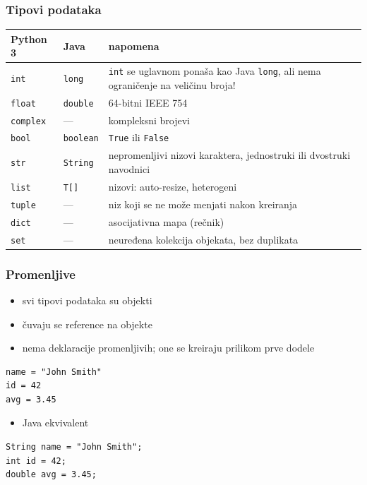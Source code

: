 \documentclass[compress]{beamer}
\begin{document}
\begin{frame}[fragile]
\frametitle{Tipovi podataka}
\begin{tabular}{llp{7cm}}
  \textbf{Python 3} & \textbf{Java} & \textbf{napomena} \\ \hline
  \texttt{int} & \texttt{long} & \texttt{int} se uglavnom ponaša kao Java \texttt{long}, ali nema ograničenje na veličinu broja! \\ \hline
  \texttt{float} & \texttt{double} & 64-bitni IEEE 754 \\ \hline
  \texttt{complex} & --- & kompleksni brojevi \\ \hline
  \texttt{bool} & \texttt{boolean} & \texttt{True} ili \texttt{False} \\ \hline
  \texttt{str} & \texttt{String} & nepromenljivi nizovi karaktera, jednostruki ili dvostruki navodnici \\ \hline
  \texttt{list} & \texttt{T[]} & nizovi: auto-resize, heterogeni \\ \hline
  \texttt{tuple} & --- & niz koji se ne može menjati nakon kreiranja \\ \hline
  \texttt{dict} & --- & asocijativna mapa (rečnik) \\ \hline
  \texttt{set} & --- & neuređena kolekcija objekata, bez duplikata
\end{tabular}
\end{frame}
  
\begin{frame}[fragile]
\frametitle{Promenljive}
\begin{itemize}
  \item svi tipovi podataka su objekti
  \item čuvaju se reference na objekte
  \item nema deklaracije promenljivih; one se kreiraju prilikom prve dodele
\end{itemize}
\begin{verbatim}
name = "John Smith"
id = 42
avg = 3.45
\end{verbatim}
\begin{itemize}
  \item Java ekvivalent
\end{itemize}
\begin{verbatim}
String name = "John Smith";
int id = 42;
double avg = 3.45;
\end{verbatim}  
\end{frame}
    
\end{document}

